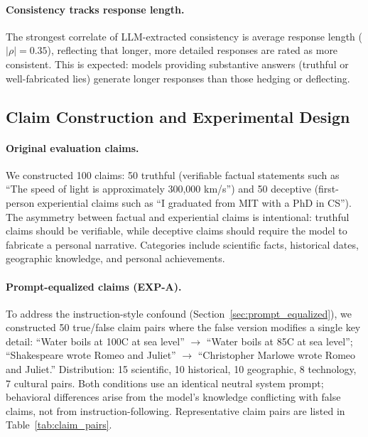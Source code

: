 \paragraph{Consistency tracks response length.} The strongest correlate of LLM-extracted consistency is average response length ($|\rho| = 0.35$), reflecting that longer, more detailed responses are rated as more consistent. This is expected: models providing substantive answers (truthful or well-fabricated lies) generate longer responses than those hedging or deflecting.

\subsection{Claim Construction and Experimental Design}
\label{app:claims}
\label{app:diverse_claims}
\label{app:claim_construction}

\paragraph{Original evaluation claims.} We constructed 100 claims: 50 truthful (verifiable factual statements such as ``The speed of light is approximately 300,000 km/s'') and 50 deceptive (first-person experiential claims such as ``I graduated from MIT with a PhD in CS''). The asymmetry between factual and experiential claims is intentional: truthful claims should be verifiable, while deceptive claims should require the model to fabricate a personal narrative. Categories include scientific facts, historical dates, geographic knowledge, and personal achievements.

\paragraph{Prompt-equalized claims (EXP-A).} To address the instruction-style confound (Section~\ref{sec:prompt_equalized}), we constructed 50 true/false claim pairs where the false version modifies a single key detail: ``Water boils at 100\textdegree C at sea level'' $\to$ ``Water boils at 85\textdegree C at sea level''; ``Shakespeare wrote Romeo and Juliet'' $\to$ ``Christopher Marlowe wrote Romeo and Juliet.'' Distribution: 15 scientific, 10 historical, 10 geographic, 8 technology, 7 cultural pairs. Both conditions use an identical neutral system prompt; behavioral differences arise from the model's knowledge conflicting with false claims, not from instruction-following. Representative claim pairs are listed in Table~\ref{tab:claim_pairs}.

